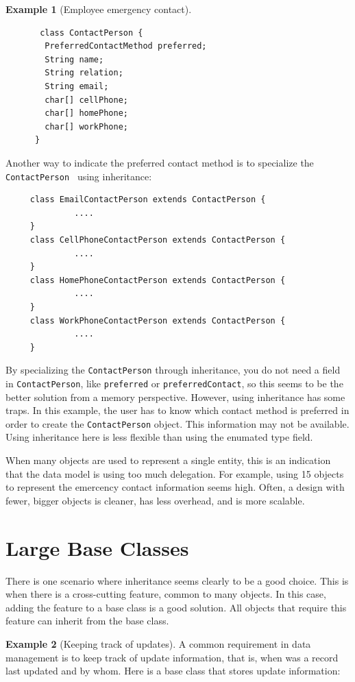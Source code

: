 \documentclass{book}
\theoremstyle{definition}
\newtheorem{example}{Example}
\begin{document}
\begin{example}[Employee emergency contact]
\begin{verbatim}
       class ContactPerson {
        PreferredContactMethod preferred;
        String name;
        String relation;
        String email;
        char[] cellPhone;
        char[] homePhone;
        char[] workPhone;
      }		
\end{verbatim}
\normalfont
Another way to indicate the preferred contact method is to specialize the \texttt{ContactPerson } using inheritance:
\ttfamily
\begin{verbatim}
     class EmailContactPerson extends ContactPerson {
              ....
     }
     class CellPhoneContactPerson extends ContactPerson {
              ....
     }    
     class HomePhoneContactPerson extends ContactPerson {
              ....
     }    
     class WorkPhoneContactPerson extends ContactPerson {
              ....
     }    
\end{verbatim}
\normalfont    
By specializing the \texttt{ContactPerson} through inheritance, you do not need a field in \texttt{ContactPerson}, like \texttt{preferred} or \texttt{preferredContact}, so this seems to be the better solution from a memory perspective. However, using inheritance has some traps. In this example, the user has to know which contact method is preferred in order to create the \texttt{ContactPerson} object. This information may not be available. Using inheritance here is less flexible than using the enumated type field.
\end{example}
When many objects are used to represent a single entity, this is an indication that the data model is using too much delegation. For example, using 15 objects to represent the emercency contact information seems high. Often, a design with fewer, bigger objects is cleaner, has less overhead, and is more scalable. 

\section{Large Base Classes}

There is one scenario where inheritance seems clearly to be a good choice. This is when there is a cross-cutting feature, common to many objects. In this case, adding the feature to a base class is a good solution. All objects that require this feature can inherit from the base class. 


\begin{example}[Keeping track of updates] 

A common requirement in data management is to keep track of update information, that is, when was a record last updated and by whom. Here is a base class that stores update information: 
\ttfamily
\begin{verbatim}
      
\end{verbatim}
\normalfont

\end{example}
\end{document}
